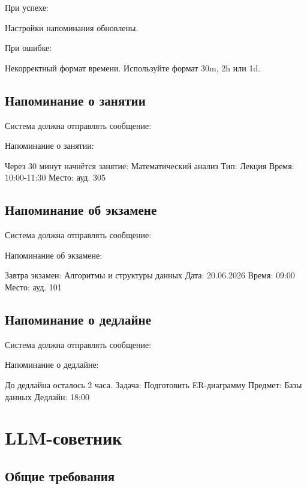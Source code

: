 \documentclass[10pt,a4paper,final]{article} %
\begin{document}
При успехе:

\begin{Code}
Настройки напоминания обновлены.
\end{Code}

При ошибке:

\begin{Code}
Некорректный формат времени. Используйте формат 30m, 2h или 1d.
\end{Code}

\subsection{Напоминание о занятии}

Система должна отправлять сообщение:

\begin{Code}
Напоминание о занятии:

Через 30 минут начнётся занятие:
Математический анализ
Тип: Лекция
Время: 10:00-11:30
Место: ауд. 305
\end{Code}

\subsection{Напоминание об экзамене}

Система должна отправлять сообщение:

\begin{Code}
Напоминание об экзамене:

Завтра экзамен:
Алгоритмы и структуры данных
Дата: 20.06.2026
Время: 09:00
Место: ауд. 101
\end{Code}

\subsection{Напоминание о дедлайне}

Система должна отправлять сообщение:

\begin{Code}
Напоминание о дедлайне:

До дедлайна осталось 2 часа.
Задача: Подготовить ER-диаграмму
Предмет: Базы данных
Дедлайн: 18:00
\end{Code}

\section{LLM-советник}

\subsection{Общие требования}
\end{document}
